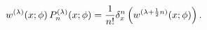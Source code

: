 \[w^{(\lambda)}(x;\phi)\mathop{P^{(\lambda)}_{n}\/}\nolimits\!\left(x;\phi\right%
)=\frac{1}{n!}\delta_{x}^{n}\left(w^{(\lambda+\frac{1}{2}n)}(x;\phi)\right).\]